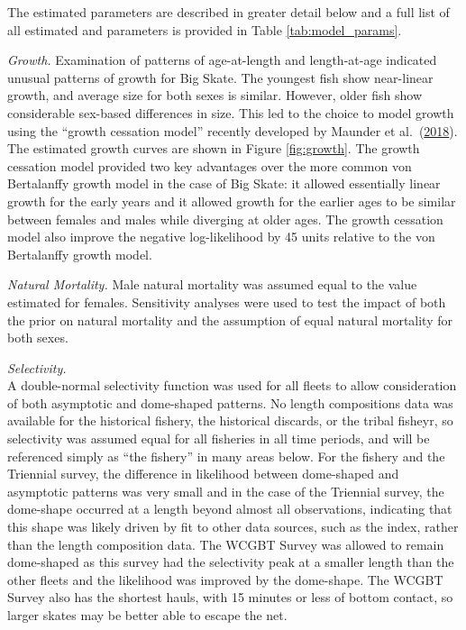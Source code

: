 \documentclass[12pt,]{article}
\begin{document}
The estimated parameters are described in greater detail below and a
full list of all estimated and parameters is provided in Table
\ref{tab:model_params}.

\emph{Growth.} Examination of patterns of age-at-length and
length-at-age indicated unusual patterns of growth for Big Skate. The
youngest fish show near-linear growth, and average size for both sexes
is similar. However, older fish show considerable sex-based differences
in size. This led to the choice to model growth using the ``growth
cessation model'' recently developed by Maunder et
al.~(\protect\hyperlink{ref-maunder2018growth}{2018}). The estimated
growth curves are shown in Figure \ref{fig:growth}. The growth cessation
model provided two key advantages over the more common von Bertalanffy
growth model in the case of Big Skate: it allowed essentially linear
growth for the early years and it allowed growth for the earlier ages to
be similar between females and males while diverging at older ages. The
growth cessation model also improve the negative log-likelihood by 45
units relative to the von Bertalanffy growth model.

\emph{Natural Mortality.} Male natural mortality was assumed equal to
the value estimated for females. Sensitivity analyses were used to test
the impact of both the prior on natural mortality and the assumption of
equal natural mortality for both sexes.

\emph{Selectivity.}\\
A double-normal selectivity function was used for all fleets to allow
consideration of both asymptotic and dome-shaped patterns. No length
compositions data was available for the historical fishery, the
historical discards, or the tribal fisheyr, so selectivity was assumed
equal for all fisheries in all time periods, and will be referenced
simply as ``the fishery'' in many areas below. For the fishery and the
Triennial survey, the difference in likelihood between dome-shaped and
asymptotic patterns was very small and in the case of the Triennial
survey, the dome-shape occurred at a length beyond almost all
observations, indicating that this shape was likely driven by fit to
other data sources, such as the index, rather than the length
composition data. The WCGBT Survey was allowed to remain dome-shaped as
this survey had the selectivity peak at a smaller length than the other
fleets and the likelihood was improved by the dome-shape. The WCGBT
Survey also has the shortest hauls, with 15 minutes or less of bottom
contact, so larger skates may be better able to escape the net.
\end{document}
